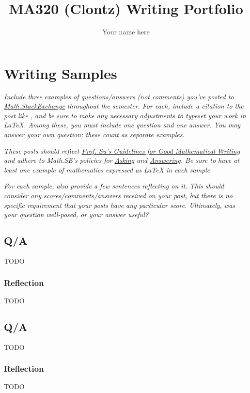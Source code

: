 \documentclass{article}
\title{MA320 (Clontz) Writing Portfolio}
\author{Your name here}
\begin{document}
\maketitle

\section{Writing Samples}
\textit{Include three examples of questions/answers
(not comments) you've posted to
\href{https://math.stackexchange.com/}
{Math.StackExchange} throughout the semester. For each, include
a citation to the post like \cite{1089984},
and be sure to make any necessary adjustments to
typeset your work in LaTeX. Among these, you must include one
question and one answer. You may answer your own question; these
count as separate examples.}

\textit{These posts should reflect
\href{https://usaonline.southalabama.edu/courses/35295/files/6197333?wrap=1}
{Prof. Su's Guidelines for Good Mathematical Writing}
and adhere to Math.SE's policies for
\href{https://math.stackexchange.com/help/asking}
{Asking}
and
\href{https://math.stackexchange.com/help/answering}
{Answering}. Be sure to have at least one example of mathematics
expressed as \LaTeX{} in each sample.}

\textit{For each sample, also provide a few sentences reflecting on it.
This should consider any scores/comments/answers received on your post,
but there is no specific requirement that your posts have any particular
score. Ultimately, was your question well-posed, or your answer useful?}

\subsection{Q/A}
TODO \cite{1089984}

\subsubsection*{Reflection}
TODO





\subsection{Q/A}
TODO \cite{1089984}

\subsubsection*{Reflection}
TODO
\end{document}
